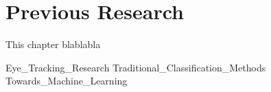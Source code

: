 \chapter{Previous Research} \label{ch:pr}

This chapter blablabla

{Eye_Tracking_Research}
{Traditional_Classification_Methods}
{Towards_Machine_Learning}